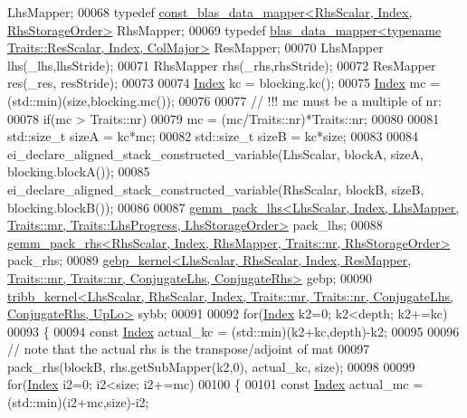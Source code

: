 \begin{DoxyCode}
       LhsMapper;
00068     \textcolor{keyword}{typedef} \hyperlink{class_eigen_1_1internal_1_1const__blas__data__mapper}{const\_blas\_data\_mapper<RhsScalar, Index, RhsStorageOrder>}
       RhsMapper;
00069     \textcolor{keyword}{typedef} \hyperlink{class_eigen_1_1internal_1_1blas__data__mapper}{blas\_data\_mapper<typename Traits::ResScalar, Index, ColMajor>}
       ResMapper;
00070     LhsMapper lhs(\_lhs,lhsStride);
00071     RhsMapper rhs(\_rhs,rhsStride);
00072     ResMapper res(\_res, resStride);
00073 
00074     \hyperlink{namespace_eigen_a62e77e0933482dafde8fe197d9a2cfde}{Index} kc = blocking.kc();
00075     \hyperlink{namespace_eigen_a62e77e0933482dafde8fe197d9a2cfde}{Index} mc = (std::min)(size,blocking.mc());
00076 
00077     \textcolor{comment}{// !!! mc must be a multiple of nr:}
00078     \textcolor{keywordflow}{if}(mc > Traits::nr)
00079       mc = (mc/Traits::nr)*Traits::nr;
00080 
00081     std::size\_t sizeA = kc*mc;
00082     std::size\_t sizeB = kc*size;
00083 
00084     ei\_declare\_aligned\_stack\_constructed\_variable(LhsScalar, blockA, sizeA, blocking.blockA());
00085     ei\_declare\_aligned\_stack\_constructed\_variable(RhsScalar, blockB, sizeB, blocking.blockB());
00086 
00087     
      \hyperlink{struct_eigen_1_1internal_1_1gemm__pack__lhs}{gemm\_pack\_lhs<LhsScalar, Index, LhsMapper, Traits::mr, Traits::LhsProgress, LhsStorageOrder>}
       pack\_lhs;
00088     \hyperlink{struct_eigen_1_1internal_1_1gemm__pack__rhs}{gemm\_pack\_rhs<RhsScalar, Index, RhsMapper, Traits::nr, RhsStorageOrder>}
       pack\_rhs;
00089     
      \hyperlink{struct_eigen_1_1internal_1_1gebp__kernel}{gebp\_kernel<LhsScalar, RhsScalar, Index, ResMapper, Traits::mr, Traits::nr, ConjugateLhs, ConjugateRhs>}
       gebp;
00090     
      \hyperlink{struct_eigen_1_1internal_1_1tribb__kernel}{tribb\_kernel<LhsScalar, RhsScalar, Index, Traits::mr, Traits::nr, ConjugateLhs, ConjugateRhs, UpLo>}
       sybb;
00091 
00092     \textcolor{keywordflow}{for}(\hyperlink{namespace_eigen_a62e77e0933482dafde8fe197d9a2cfde}{Index} k2=0; k2<depth; k2+=kc)
00093     \{
00094       \textcolor{keyword}{const} \hyperlink{namespace_eigen_a62e77e0933482dafde8fe197d9a2cfde}{Index} actual\_kc = (std::min)(k2+kc,depth)-k2;
00095 
00096       \textcolor{comment}{// note that the actual rhs is the transpose/adjoint of mat}
00097       pack\_rhs(blockB, rhs.getSubMapper(k2,0), actual\_kc, size);
00098 
00099       \textcolor{keywordflow}{for}(\hyperlink{namespace_eigen_a62e77e0933482dafde8fe197d9a2cfde}{Index} i2=0; i2<size; i2+=mc)
00100       \{
00101         \textcolor{keyword}{const} \hyperlink{namespace_eigen_a62e77e0933482dafde8fe197d9a2cfde}{Index} actual\_mc = (std::min)(i2+mc,size)-i2;

\end{DoxyCode}
